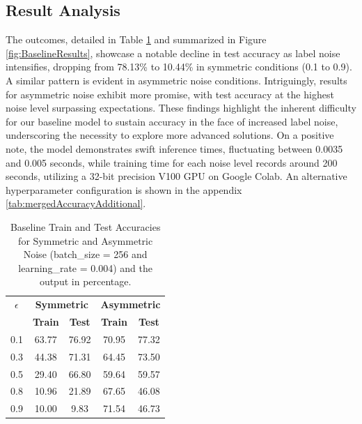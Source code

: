 \documentclass[11pt,twocolumn,letterpaper]{article}
\begin{document}
\subsection*{Result Analysis}
The outcomes, detailed in Table \ref{tab:mergedAccuracy} and summarized in Figure \ref{fig:BaselineResults}, showcase a notable decline in test accuracy as label noise intensifies, dropping from 78.13\% to 10.44\% in symmetric conditions (0.1 to 0.9). A similar pattern is evident in asymmetric noise conditions. Intriguingly, results for asymmetric noise exhibit more promise, with test accuracy at the highest noise level surpassing expectations. These findings highlight the inherent difficulty for our baseline model to sustain accuracy in the face of increased label noise, underscoring the necessity to explore more advanced solutions. On a positive note, the model demonstrates swift inference times, fluctuating between 0.0035 and 0.005 seconds, while training time for each noise level records around 200 seconds, utilizing a 32-bit precision V100 GPU on Google Colab. An alternative hyperparameter configuration is shown in the appendix \ref{tab:mergedAccuracyAdditional}.

\begin{table}[h]
\centering
\begin{tabular}{|c|c|c|c|c|}
\hline
\textbf{\(\epsilon\)} & \multicolumn{2}{c|}{\textbf{Symmetric}} & \multicolumn{2}{c|}{\textbf{Asymmetric}} \\
\cline{2-5}
 & \textbf{Train} & \textbf{Test} & \textbf{Train} & \textbf{Test} \\
\hline
0.1 & 63.77 & 76.92 & 70.95 & 77.32 \\
\hline
0.3 & 44.38 & 71.31 & 64.45 & 73.50 \\
\hline
0.5 & 29.40 & 66.80 & 59.64 & 59.57 \\
\hline
0.8 & 10.96 & 21.89 & 67.65 & 46.08 \\
\hline
0.9 & 10.00 & 9.83 & 71.54 & 46.73 \\
\hline
\end{tabular}
\caption{Baseline Train and Test Accuracies for Symmetric and Asymmetric Noise (batch\_size = 256 and learning\_rate = 0.004) and the output in percentage.}
\label{tab:mergedAccuracy}
\end{table}
\end{document}
